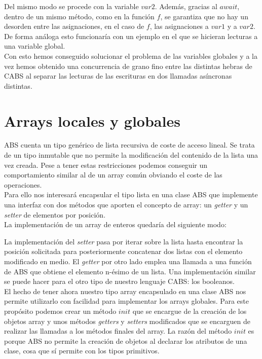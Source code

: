 Del mismo modo se procede con la variable $var2$. Además, gracias al $await$, dentro de un mismo método, como en la función $f$, se garantiza que no hay un desorden entre las asignaciones, en el caso de $f$, las asignaciones a $var1$ y a $var2$. De forma análoga esto funcionaría con un ejemplo en el que se hicieran lecturas a una variable global.\\

Con esto hemos conseguido solucionar el problema de las variables globales y a la vez hemos obtenido una concurrencia de grano fino entre las distintas hebras de CABS al separar las lecturas de las escrituras en dos llamadas asíncronas distintas.

\section{Arrays locales y globales}

ABS cuenta un tipo genérico de lista recursiva de coste de acceso lineal. Se trata de un tipo inmutable que no permite la modificación del contenido de la lista una vez creada. Pese a tener estas restricciones podemos conseguir un comportamiento similar al de un array común obviando el coste de las operaciones.\\

Para ello nos interesará encapsular el tipo lista en una clase ABS que implemente una interfaz con dos métodos que aporten el concepto de array:
un \emph{getter} y un \emph{setter} de elementos por posición.\\

La implementación de un array de enteros quedaría del siguiente modo:



La implementación del \emph{setter} pasa por iterar sobre la lista hasta encontrar la posición solicitada para posteriormente concatenar dos listas con el elemento modificado en medio. El \emph{getter} por otro lado emplea una llamada a una función de ABS que obtiene el elemento n-ésimo de un lista. Una implementación similar se puede hacer para el otro tipo de nuestro lenguaje CABS: los booleanos.\\

El hecho de tener ahora nuestro tipo array encapsulado en una clase ABS nos permite utilizarlo con facilidad para implementar los arrays globales. Para este propósito podemos crear un método $init$ que se encargue de la creación de los objetos array y unos métodos \emph{getters} y \emph{setters} modificados que se encarguen de realizar las llamadas a los métodos finales del array. La razón del método $init$ es porque ABS no permite la creación de objetos al declarar los atributos de una clase, cosa que sí permite con los tipos primitivos.\\

